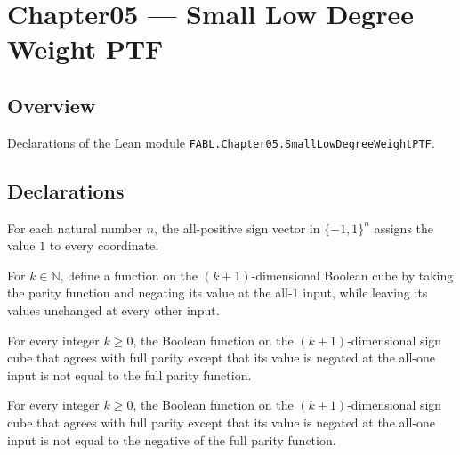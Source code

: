 \chapter{Chapter05 — Small Low Degree Weight PTF}
\section{Overview}

Declarations of the Lean module \texttt{FABL.Chapter05.SmallLowDegreeWeightPTF}.

\section{Declarations}

\begin{definition}
\label{FABL.allOneSignCube}
\leanok
For each natural number $n$, the all-positive sign vector in $\{-1,1\}^n$ assigns the
value $1$ to every coordinate.
\end{definition}

\begin{definition}
\label{FABL.onePointFlippedParity}
\leanok
{}
For $k\in\mathbb N$, define a function on the $(k+1)$-dimensional Boolean cube by taking
the parity function and negating its value at the all-$1$ input, while leaving its
values unchanged at every other input.
\end{definition}

\begin{theorem}
\label{FABL.onePointFlippedParity_ne_fullParity}
\leanok
{}
For every integer $k\ge 0$, the Boolean function on the $(k+1)$-dimensional sign cube
that agrees with full parity except that its value is negated at the all-one input is
not equal to the full parity function.
\end{theorem}

\begin{theorem}
\label{FABL.onePointFlippedParity_ne_neg_fullParity}
\leanok
{}
For every integer $k\ge 0$, the Boolean function on the $(k+1)$-dimensional sign cube
that agrees with full parity except that its value is negated at the all-one input is
not equal to the negative of the full parity function.
\end{theorem}

